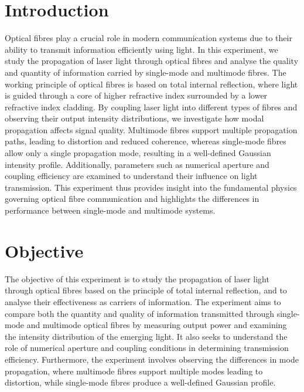 
\renewcommand{\arraystretch}{1.5} %

\section{Introduction}
Optical fibres play a crucial role in modern communication systems due to their ability to transmit information efficiently using light. In this experiment, we study the propagation of laser light through optical fibres and analyse the quality and quantity of information carried by single-mode and multimode fibres. The working principle of optical fibres is based on total internal reflection, where light is guided through a core of higher refractive index surrounded by a lower refractive index cladding. By coupling laser light into different types of fibres and observing their output intensity distributions, we investigate how modal propagation affects signal quality. Multimode fibres support multiple propagation paths, leading to distortion and reduced coherence, whereas single-mode fibres allow only a single propagation mode, resulting in a well-defined Gaussian intensity profile. Additionally, parameters such as numerical aperture and coupling efficiency are examined to understand their influence on light transmission. This experiment thus provides insight into the fundamental physics governing optical fibre communication and highlights the differences in performance between single-mode and multimode systems.
\section{Objective}
The objective of this experiment is to study the propagation of laser light through optical fibres based on the principle of total internal reflection, and to analyse their effectiveness as carriers of information. The experiment aims to compare both the quantity and quality of information transmitted through single-mode and multimode optical fibres by measuring output power and examining the intensity distribution of the emerging light. It also seeks to understand the role of numerical aperture and coupling conditions in determining transmission efficiency. Furthermore, the experiment involves observing the differences in mode propagation, where multimode fibres support multiple modes leading to distortion, while single-mode fibres produce a well-defined Gaussian profile.
